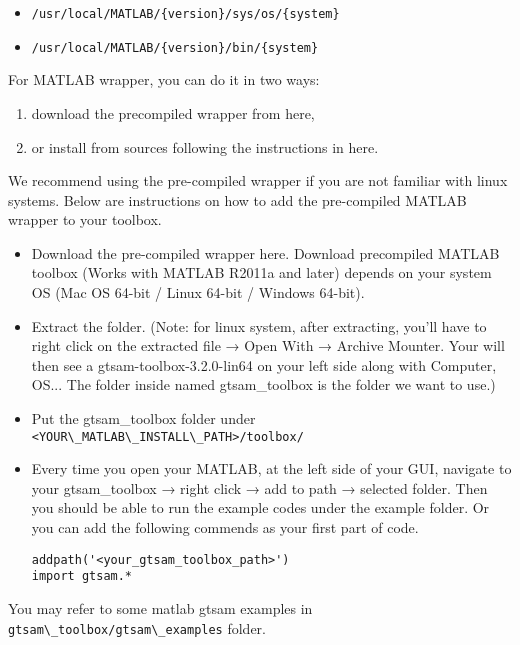\documentclass[tp]{lcc}
\begin{document}
\begin{itemize}
    \item \lstinline[style=bash]|/usr/local/MATLAB/{version}/sys/os/{system}|
    \item \lstinline[style=bash]|/usr/local/MATLAB/{version}/bin/{system}|
\end{itemize}

For MATLAB wrapper, you can do it in two ways:

\begin{enumerate}
    \item download the precompiled wrapper from here,
    \item or install from sources following the instructions in here.
\end{enumerate}

We recommend using the pre-compiled wrapper if you are not familiar with linux systems. Below are instructions on how to add the pre-compiled MATLAB wrapper to your toolbox.

\begin{itemize}
    \item Download the pre-compiled wrapper here. Download precompiled MATLAB toolbox (Works with MATLAB R2011a and later) depends on your system OS (Mac OS 64-bit / Linux 64-bit / Windows 64-bit).
    \item Extract the folder. (Note: for linux system, after extracting, you'll have to right click on the extracted file → Open With → Archive Mounter. Your will then see a gtsam-toolbox-3.2.0-lin64 on your left side along with Computer, OS... The folder inside named gtsam\_toolbox is the folder we want to use.)
    \item Put the gtsam\_toolbox folder under \lstinline[style=bash]{<YOUR\_MATLAB\_INSTALL\_PATH>/toolbox/}
    \item Every time you open your MATLAB, at the left side of your GUI, navigate to your gtsam\_toolbox → right click → add to path → selected folder. Then you should be able to run the example codes under the example folder. Or you can add the following commends as your first part of code.
    \begin{lstlisting}[style=bash]
addpath('<your_gtsam_toolbox_path>')
import gtsam.*
    \end{lstlisting}
\end{itemize}

You may refer to some matlab gtsam examples in \lstinline[style=bash]{gtsam\_toolbox/gtsam\_examples} folder.
\end{document}
